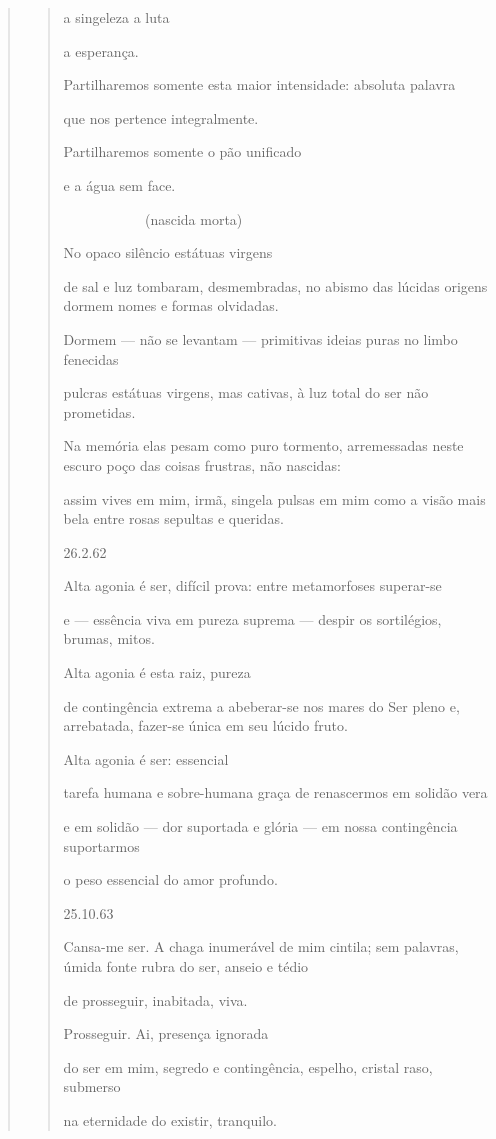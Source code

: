 \begin{verse}
\begin{quote}
a singeleza a luta

a esperança.

Partilharemos somente esta maior intensidade: absoluta palavra

que nos pertence integralmente.

Partilharemos somente o pão unificado

e a água sem face.

    (nascida morta)

No opaco silêncio estátuas virgens

de sal e luz tombaram, desmembradas, no abismo das lúcidas origens
dormem nomes e formas olvidadas.

Dormem --- não se levantam --- primitivas ideias puras no limbo
fenecidas

pulcras estátuas virgens, mas cativas, à luz total do ser não
prometidas.

Na memória elas pesam como puro tormento, arremessadas neste escuro poço
das coisas frustras, não nascidas:

assim vives em mim, irmã, singela pulsas em mim como a visão mais bela
entre rosas sepultas e queridas.

26.2.62

Alta agonia é ser, difícil prova: entre metamorfoses superar-se

e --- essência viva em pureza suprema --- despir os sortilégios, brumas,
mitos.

Alta agonia é esta raiz, pureza

de contingência extrema a abeberar-se nos mares do Ser pleno e,
arrebatada, fazer-se única em seu lúcido fruto.

Alta agonia é ser: essencial

tarefa humana e sobre-humana graça de renascermos em solidão vera

e em solidão --- dor suportada e glória --- em nossa contingência
suportarmos

o peso essencial do amor profundo.

25.10.63

Cansa-me ser. A chaga inumerável de mim cintila; sem palavras, úmida
fonte rubra do ser, anseio e tédio

de prosseguir, inabitada, viva.

Prosseguir. Ai, presença ignorada

do ser em mim, segredo e contingência, espelho, cristal raso, submerso

na eternidade do existir, tranquilo.


\end{quote}
\end{verse}
